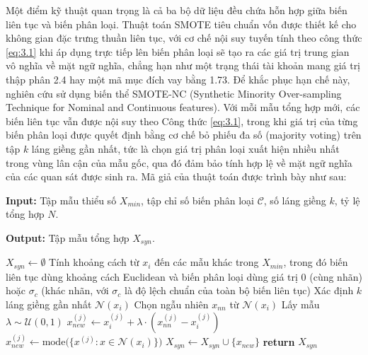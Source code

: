 Một điểm kỹ thuật quan trọng là cả ba bộ dữ liệu đều chứa hỗn hợp giữa biến liên tục và biến phân loại. Thuật toán SMOTE tiêu chuẩn \citep{chawla2002smote} vốn được thiết kế cho không gian đặc trưng thuần liên tục, với cơ chế nội suy tuyến tính theo công thức \ref{eq:3.1} khi áp dụng trực tiếp lên biến phân loại sẽ tạo ra các giá trị trung gian vô nghĩa về mặt ngữ nghĩa, chẳng hạn như một trạng thái tài khoản mang giá trị thập phân 2.4 hay một mã mục đích vay bằng 1.73. Để khắc phục hạn chế này, nghiên cứu sử dụng biến thể SMOTE-NC (Synthetic Minority Over-sampling Technique for Nominal and Continuous features). Với mỗi mẫu tổng hợp mới, các biến liên tục vẫn được nội suy theo Công thức \ref{eq:3.1}, trong khi giá trị của từng biến phân loại được quyết định bằng cơ chế bỏ phiếu đa số (majority voting) trên tập $k$ láng giềng gần nhất, tức là chọn giá trị phân loại xuất hiện nhiều nhất trong vùng lân cận của mẫu gốc, qua đó đảm bảo tính hợp lệ về mặt ngữ nghĩa của các quan sát được sinh ra. Mã giả của thuật toán được trình bày như sau:

\vspace{0.5em}
\begin{algorithm}[H]
\caption{Mã giả của thuật toán SMOTE-NC}
\label{alg:smote_nc}

\vspace{0.5em}
\textbf{Input:} Tập mẫu thiểu số $X_{min}$, tập chỉ số biến phân loại $\mathcal{C}$, số láng giềng $k$, tỷ lệ tổng hợp $N$.

\vspace{0.5cm}

\textbf{Output:} Tập mẫu tổng hợp $X_{syn}$.

\begin{tcolorbox}
\begin{algorithmic}[1]
    \State $X_{syn} \gets \emptyset$
        \State Tính khoảng cách từ $x_i$ đến các mẫu khác trong $X_{min}$, trong đó biến liên tục dùng khoảng cách Euclidean và biến phân loại dùng giá trị $0$ (cùng nhãn) hoặc $\sigma_c$ (khác nhãn, với $\sigma_c$ là độ lệch chuẩn của toàn bộ biến liên tục)
        \State Xác định $k$ láng giềng gần nhất $\mathcal{N}(x_i)$
            \State Chọn ngẫu nhiên $x_{nn}$ từ $\mathcal{N}(x_i)$
            \State Lấy mẫu $\lambda \sim \mathcal{U}(0, 1)$
                 
                    \State $x_{new}^{(j)} \gets x_i^{(j)} + \lambda \cdot (x_{nn}^{(j)} - x_i^{(j)})$
                \Else {}
                    \State $x_{new}^{(j)} \gets \text{mode}\bigl(\{x^{(j)} : x \in \mathcal{N}(x_i)\}\bigr)$
                \EndIf
            \EndFor
            \State $X_{syn} \gets X_{syn} \cup \{x_{new}\}$
        \EndFor
    \EndFor
    \State \textbf{return} $X_{syn}$
\end{algorithmic}
\end{tcolorbox}
\end{algorithm}
\vspace{0.5em}

